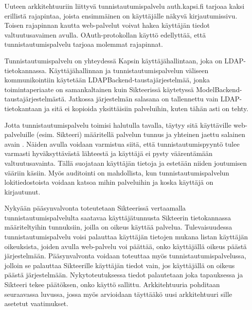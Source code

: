 Uuteen arkkitehtuuriin liittyvä tunnistautumispalvelu auth.kapsi.fi tarjoaa kaksi erillistä rajapintaa, joista ensimmäinen on käyttäjälle näkyvä kirjautumissivu. Toisen rajapinnan kautta web-palvelut voivat hakea käyttäjän tiedot valtuutusavaimen avulla. OAuth-protokollan käyttö edellyttää, että tunnistautumispalvelu tarjoaa molemmat rajapinnat.

Tunnistautumispalvelu on yhteydessä Kapsin käyttäjähallintaan, joka on LDAP-tietokannassa. Käyttäjähallinnan ja tunnistautumispalvelun väliseen kommunikointiin käytetään LDAPBack\-end-taustajärjestelmää, jonka toimintaperiaate on samankaltainen kuin Sikteerissä käytetyssä ModelBackend-taustajärjestelmästä. Jatkossa järjestelmän salasana on tallennettu vain LDAP-tietokantaan ja sitä ei kopioida yksittäisiin palveluihin, kuten tähän asti on tehty.

Jotta tunnistautumispalvelu toimisi halutulla tavalla, täytyy sitä käyttäville web-palveluille (esim. Sikteeri) määritellä palvelun tunnus ja yhteinen jaettu salainen avain \cite{oauth2_0}. Näiden avulla voidaan varmistua siitä, että tunnistautumispyyntö tulee varmasti hyväksyttävästä lähteestä ja käyttäjä ei pysty väärentämään valtuutusavainta. Tällä suojataan käyttäjän tietoja ja estetään niiden joutumisen vääriin käsiin. Myös auditointi on mahdollista, kun tunnistautumispalvelun lokitiedostoista voidaan katsoa mihin palveluihin ja koska käyttäjä on kirjautunut.

Nykyään pääsynvalvonta toteutetaan Sikteerissä vertaamalla tunnistautumispalvelulta saatavaa käyttäjätunnusta Sikteerin tietokannassa määriteltyihin tunnuksiin, joilla on oikeus käyttää palvelua. Tulevaisuudessa tunnistautumispalvelu voisi palauttaa käyttäjän tietojen mukana listan käyttäjän oikeuksista, joiden avulla web-palvelu voi päättää, onko käyttäjällä oikeus päästä järjestelmään. Pääsynvalvonta voidaan toteuttaa myös tunnistautumispalvelussa, jolloin se palauttaa Sikteerille käyttäjän tiedot vain, jos käyttäjällä on oikeus päästä järjestelmään. Nykytoteutuksessa tiedot palautetaan joka tapauksessa ja Sikteeri tekee päätöksen, onko käyttö sallittu. Arkkitehtuuria pohditaan seuraavassa luvussa, jossa myös arvioidaan täyttääkö uusi arkkitehtuuri sille asetetut vaatimukset.